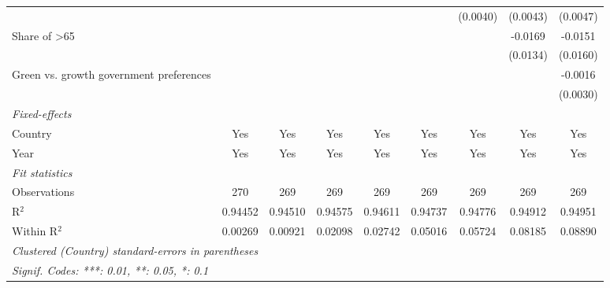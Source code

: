 \begin{table}[htbp]
\begin{tabular}{lcccccccc}
                                                &          &          &          &          &          & (0.0040) & (0.0043)      & (0.0047)\\   
      Share of >65                              &          &          &          &          &          &          & -0.0169       & -0.0151\\   
                                                &          &          &          &          &          &          & (0.0134)      & (0.0160)\\   
      Green vs. growth government preferences   &          &          &          &          &          &          &               & -0.0016\\   
                                                &          &          &          &          &          &          &               & (0.0030)\\   
      \midrule
      \emph{Fixed-effects}\\
      Country                                   & Yes      & Yes      & Yes      & Yes      & Yes      & Yes      & Yes           & Yes\\  
      Year                                      & Yes      & Yes      & Yes      & Yes      & Yes      & Yes      & Yes           & Yes\\  
      \midrule
      \emph{Fit statistics}\\
      Observations                              & 270      & 269      & 269      & 269      & 269      & 269      & 269           & 269\\  
      R$^2$                                     & 0.94452  & 0.94510  & 0.94575  & 0.94611  & 0.94737  & 0.94776  & 0.94912       & 0.94951\\  
      Within R$^2$                              & 0.00269  & 0.00921  & 0.02098  & 0.02742  & 0.05016  & 0.05724  & 0.08185       & 0.08890\\  
      \midrule \midrule
      \multicolumn{9}{l}{\emph{Clustered (Country) standard-errors in parentheses}}\\
      \multicolumn{9}{l}{\emph{Signif. Codes: ***: 0.01, **: 0.05, *: 0.1}}\\
   \end{tabular}
\end{table}


